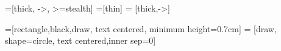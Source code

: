 \usetikzlibrary{positioning}
\usetikzlibrary{fit}

=[thick, ->, >=stealth]
=[thin]
 = [thick,->]

=[rectangle,black,draw, text centered, minimum height=0.7cm]
 = [draw, shape=circle, text centered,inner sep=0]



